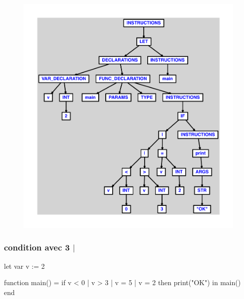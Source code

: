 \documentclass{article}
\begin{document}
\begin{figure}[H]\centering\includegraphics[max width=\textwidth]{ast/ast_274.pdf}\end{figure}\subsubsection{condition avec 3 $ | $}
\begin{verbatimtab}
let
	var v := 2

	function main() =
		if v < 0 | v > 3 | v = 5 | v = 2 then print("OK")
in main() end
\end{verbatimtab}
\end{document}
